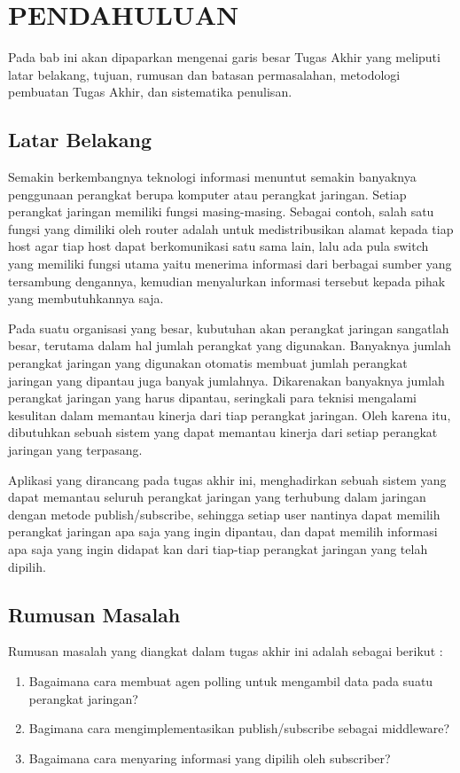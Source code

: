 \chapter{PENDAHULUAN}
	Pada bab ini akan dipaparkan mengenai garis besar Tugas Akhir yang meliputi latar belakang, tujuan, rumusan dan batasan permasalahan, metodologi pembuatan Tugas Akhir, dan sistematika penulisan.
        
	\section{Latar Belakang}
		Semakin berkembangnya teknologi informasi menuntut semakin banyaknya penggunaan perangkat berupa komputer atau perangkat jaringan. Setiap perangkat jaringan memiliki fungsi masing-masing. Sebagai contoh, salah satu fungsi yang dimiliki oleh router adalah untuk medistribusikan alamat kepada tiap host agar tiap host dapat berkomunikasi satu sama lain, lalu ada pula switch yang memiliki fungsi utama yaitu menerima informasi dari berbagai sumber yang tersambung dengannya, kemudian menyalurkan informasi tersebut kepada pihak yang membutuhkannya saja.
		
		Pada suatu organisasi yang besar, kubutuhan akan perangkat jaringan sangatlah besar, terutama dalam hal jumlah perangkat yang digunakan. Banyaknya jumlah perangkat jaringan yang digunakan otomatis membuat jumlah perangkat jaringan yang dipantau juga banyak jumlahnya. Dikarenakan banyaknya jumlah perangkat jaringan yang harus dipantau, seringkali para teknisi mengalami kesulitan dalam memantau kinerja dari tiap perangkat jaringan. Oleh karena itu, dibutuhkan sebuah sistem yang dapat memantau kinerja dari setiap perangkat jaringan yang terpasang.
		
		Aplikasi yang dirancang pada tugas akhir ini, menghadirkan sebuah sistem yang dapat memantau seluruh perangkat jaringan yang terhubung dalam jaringan dengan metode publish/subscribe, sehingga setiap user nantinya dapat memilih perangkat jaringan apa saja yang ingin dipantau, dan dapat memilih informasi apa saja yang ingin didapat kan dari tiap-tiap perangkat jaringan yang telah dipilih.

	\section{Rumusan Masalah}
       	Rumusan masalah yang diangkat dalam tugas akhir ini adalah sebagai berikut :
		\begin{enumerate}
			\item Bagaimana cara membuat agen polling untuk mengambil data pada suatu perangkat jaringan?
			\item Bagimana cara mengimplementasikan publish/subscribe sebagai middleware?
            \item Bagaimana cara menyaring informasi yang dipilih oleh subscriber?
		\end{enumerate}

